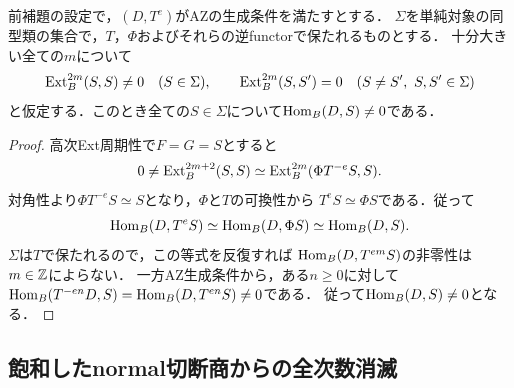 \documentclass[11pt,a4paper]{ltjsarticle}
\begin{document}
\begin{proposition}[高次の偶数Extが対角的な単純対象への障害]
\label{prop:v6-diagonal-simple-obstruction}
前補題の設定で，$(D,T^e)$がAZの生成条件を満たすとする．
$\Sigma$を単純対象の同型類の集合で，$T$，$\Phi$およびそれらの逆functorで保たれるものとする．
十分大きい全ての$m$について
\[
 \operatorname{Ext}_B^{2m}(S,S)\ne0\quad(S\in\Sigma),\qquad
 \operatorname{Ext}_B^{2m}(S,S')=0\quad(S\ne S',\ S,S'\in\Sigma)
\]
と仮定する．このとき全ての$S\in\Sigma$について$\operatorname{Hom}_B(D,S)\ne0$である．
\end{proposition}
\begin{proof}
高次Ext周期性で$F=G=S$とすると
\[
 0\ne\operatorname{Ext}_B^{2m+2}(S,S)
 \simeq\operatorname{Ext}_B^{2m}(\Phi T^{-e}S,S).
\]
対角性より$\Phi T^{-e}S\simeq S$となり，$\Phi$と$T$の可換性から
$T^eS\simeq\Phi S$である．従って
\[
 \operatorname{Hom}_B(D,T^eS)\simeq\operatorname{Hom}_B(D,\Phi S)
 \simeq\operatorname{Hom}_B(D,S).
\]
$\Sigma$は$T$で保たれるので，この等式を反復すれば
$\operatorname{Hom}_B(D,T^{em}S)$の非零性は$m\in\mathbb Z$によらない．
一方AZ生成条件から，ある$n\geq0$に対して
$\operatorname{Hom}_B(T^{-en}D,S)=\operatorname{Hom}_B(D,T^{en}S)\ne0$である．
従って$\operatorname{Hom}_B(D,S)\ne0$となる．
\end{proof}

\subsection{飽和したnormal切断商からの全次数消滅}
\end{document}

